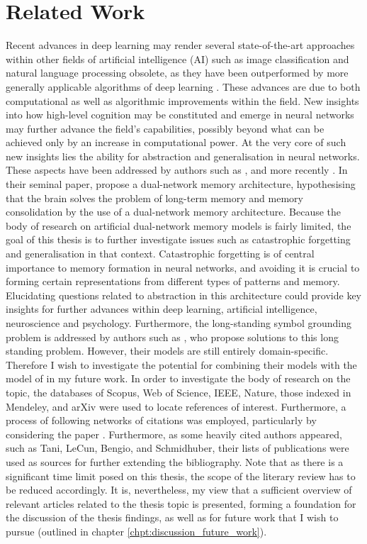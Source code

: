 
\chapter{Related Work}

Recent advances in deep learning may render several state-of-the-art approaches within other fields of artificial intelligence (AI) such as image classification and natural language processing obsolete, as they have been outperformed by more generally applicable algorithms of deep learning \citep{LeCun2015, Schmidhuber2014}. These advances are due to both computational as well as algorithmic improvements within the field. New insights into how high-level cognition may be constituted and emerge in neural networks may further advance the field's capabilities, possibly beyond what can be achieved only by an increase in computational power. At the very core of such new insights lies the ability for abstraction and generalisation in neural networks. These aspects have been addressed by authors such as \cite{McClelland1995}, and more recently \cite{Hattori2014}. In their seminal paper, \cite{McClelland1995} propose a dual-network memory architecture, hypothesising that the brain solves the problem of long-term memory and memory consolidation by the use of a dual-network memory architecture. Because the body of research on artificial dual-network memory models is fairly limited, the goal of this thesis is to further investigate issues such as catastrophic forgetting and generalisation in that context. Catastrophic forgetting is of central importance to memory formation in neural networks, and avoiding it is crucial to forming certain representations from different types of patterns and memory. Elucidating questions related to abstraction in this architecture could provide key insights for further advances within deep learning, artificial intelligence, neuroscience and psychology. Furthermore, the long-standing symbol grounding problem is addressed by authors such as \cite{Yamashita2008, Tani2014}, who propose solutions to this long standing problem. However, their models are still entirely domain-specific. Therefore I wish to investigate the potential for combining their models with the model of \citep{Hattori2014} in my future work.
In order to investigate the body of research on the topic, the databases of Scopus, Web of Science, IEEE, Nature, those indexed in Mendeley, and arXiv were used to locate references of interest. Furthermore, a process of following networks of citations was employed, particularly by considering the paper \citep{McClelland1995}. Furthermore, as some heavily cited authors appeared, such as Tani, LeCun, Bengio, and Schmidhuber, their lists of publications were used as sources for further extending the bibliography. Note that as there is a significant time limit posed on this thesis, the scope of the literary review has to be reduced accordingly. It is, nevertheless, my view that a sufficient overview of relevant articles related to the thesis topic is presented, forming a foundation for the discussion of the thesis findings, as well as for future work that I wish to pursue (outlined in chapter \ref{chpt:discussion_future_work}).

